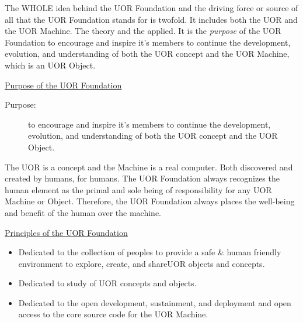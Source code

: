 \documentclass[twocolumn,10pt]{article}
\begin{document}
The WHOLE idea behind the UOR Foundation and the driving force or source of all that the UOR Foundation stands for is twofold.
It includes both the UOR and the UOR Machine.
The theory and the applied.
It is the \textit{purpose} of the UOR Foundation to encourage and inspire it's members to continue the development, evolution, and understanding of both the UOR concept and the UOR Machine, which is an UOR Object.

\vspace{20pt}
\begin{minipage}{0.95\linewidth}
    \begin{tcolorbox}
    \begin{center}\underline{Purpose of the UOR Foundation}\end{center}
        \begin{description}
            \item[Purpose:] to encourage and inspire it's members to continue the development, evolution, and understanding of both the UOR concept and the UOR Object.
        \end{description}
    \end{tcolorbox}
\end{minipage}
\vspace{10pt}


The UOR is a concept and the Machine is a real computer.
Both discovered and created by humans, for humans.
The UOR Foundation always recognizes the human element as the primal and sole being of responsibility for any UOR Machine or Object.
Therefore, the UOR Foundation always places the well-being and benefit of the human over the machine.

\vspace{20pt}
\begin{minipage}{0.95\linewidth}
    \begin{tcolorbox}
    \begin{center}\underline{Principles of the UOR Foundation}\end{center}
        \begin{itemize}
            \item Dedicated to the collection of peoples to provide a safe \& human friendly environment to explore, create, and share\@ UOR objects and concepts. 
            \item Dedicated to study of UOR concepts and objects.
            \item Dedicated to the open development, sustainment, and deployment and open access to the core source code for the UOR Machine\@.
        \end{itemize}
    \end{tcolorbox}
\end{minipage}
\vspace{10pt}
\end{document}
